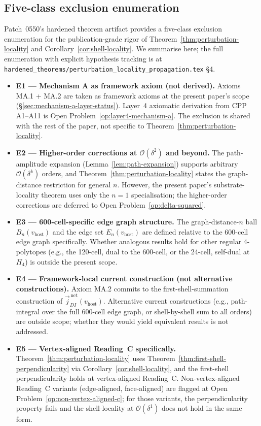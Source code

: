 \documentclass[11pt,letterpaper]{article}
\newcommand{\vhost}{v_{\text{host}}}
\newcommand{\jDInet}{\vec{j}_{DI}^{\,\text{net}}}
\newcommand{\bigO}[1]{\mathcal{O}(#1)}
\begin{document}
\subsection{Five-class exclusion enumeration}
\label{sec:exclusion-enumeration-section6}

Patch~0550's hardened theorem artifact provides a five-class exclusion enumeration for the publication-grade rigor of Theorem~\ref{thm:perturbation-locality} and Corollary~\ref{cor:shell-locality}. We summarise here; the full enumeration with explicit hypothesis tracking is at \texttt{hardened\_theorems/perturbation\_locality\_propagation.tex} \S4.

\begin{itemize}[leftmargin=2em]
\item \textbf{E1 --- Mechanism A as framework axiom (not derived).} Axioms MA.1 + MA.2 are taken as framework axioms at the present paper's scope (\S\ref{sec:mechanism-a-layer-status}). Layer~4 axiomatic derivation from CPP A1--A11 is Open Problem~\ref{op:layer4-mechanism-a}. The exclusion is shared with the rest of the paper, not specific to Theorem~\ref{thm:perturbation-locality}.
\item \textbf{E2 --- Higher-order corrections at $\bigO{\delta^2}$ and beyond.} The path-amplitude expansion (Lemma~\ref{lem:path-expansion}) supports arbitrary $\bigO{\delta^k}$ orders, and Theorem~\ref{thm:perturbation-locality} states the graph-distance restriction for general $n$. However, the present paper's substrate-locality theorem uses only the $n = 1$ specialisation; the higher-order corrections are deferred to Open Problem~\ref{op:delta-squared}.
\item \textbf{E3 --- 600-cell-specific edge graph structure.} The graph-distance-$n$ ball $B_n(\vhost)$ and the edge set $E_n(\vhost)$ are defined relative to the 600-cell edge graph specifically. Whether analogous results hold for other regular 4-polytopes (e.g., the 120-cell, dual to the 600-cell, or the 24-cell, self-dual at $H_4$) is outside the present scope.
\item \textbf{E4 --- Framework-local current construction (not alternative constructions).} Axiom MA.2 commits to the first-shell-summation construction of $\jDInet(\vhost)$. Alternative current constructions (e.g., path-integral over the full 600-cell edge graph, or shell-by-shell sum to all orders) are outside scope; whether they would yield equivalent results is not addressed.
\item \textbf{E5 --- Vertex-aligned Reading~C specifically.} Theorem~\ref{thm:perturbation-locality} uses Theorem~\ref{thm:first-shell-perpendicularity} via Corollary~\ref{cor:shell-locality}, and the first-shell perpendicularity holds at vertex-aligned Reading~C. Non-vertex-aligned Reading~C variants (edge-aligned, face-aligned) are flagged at Open Problem~\ref{op:non-vertex-aligned-c}; for those variants, the perpendicularity property fails and the shell-locality at $\bigO{\delta^1}$ does not hold in the same form.
\end{itemize}
\end{document}
